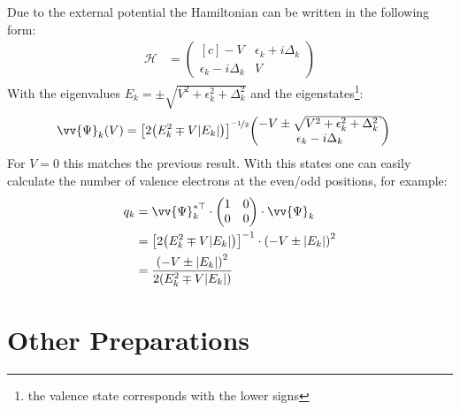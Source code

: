 Due to the external potential the Hamiltonian can be written in the following form:
\begin{align}
	\mathcal{H} &= \begin{pmatrix*}[c]
	-V & \epsilon_k + i \Delta_k \\
	\epsilon_k - i \Delta_k & V
	\end{pmatrix*}
\end{align}
With the eigenvalues $E_k = \pm \sqrt{V^2+\epsilon_k^2+\Delta_k^2}$ and the eigenstates\footnote{the valence state corresponds with the lower signs}:
\begin{align}
	\vv{\Psi}_k(V) &= \left[2\left(E_k^2\mp V|E_k|\right)\right]^{\nicefrac{-1}{2}}  \begin{pmatrix*}[c]
	-V\pm \sqrt{V^2+\epsilon_k^2+\Delta_k^2}\\
	\epsilon_k - i \Delta_k
	\end{pmatrix*}
\end{align}
For $V=0$ this matches the previous result. With this states one can easily calculate the number of valence electrons at the even/odd positions, for example:
\begin{align}
	q_k &= \vv{\Psi}_k^{*\top}\cdot\begin{pmatrix*}[c]
	1 & 0\\
	0 & 0
	\end{pmatrix*}\cdot \vv{\Psi}_k\\
	&= \left[2\left(E_k^2\mp V|E_k|\right)\right]^{-1} \cdot \left(-V\pm |E_k|\right)^2\\
	&= \frac{\left(-V \pm |E_k|\right)^2}{2\left(E_k^2\mp V|E_k|\right)}
\end{align}

\section{Other Preparations}
\begin{figure}
\centering

\end{figure}